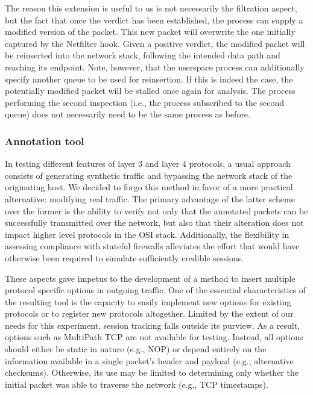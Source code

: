 The reason this extension is useful to us is not necessarily the filtration aspect, but the fact that once the verdict has been established, the process can supply a modified version of the packet. This new packet will overwrite the one initially captured by the Netfilter hook. Given a positive verdict, the modified packet will be reinserted into the network stack, following the intended data path and reaching its endpoint. Note, however, that the userspace process can additionally specify another queue to be used for reinsertion. If this is indeed the case, the potentially modified packet will be stalled once again for analysis. The process performing the second inspection (i.e., the process subscribed to the second queue) does not necessarily need to be the same process as before.

\subsubsection{Annotation tool}
\label{extend:ops:architecture:annotation}

In testing different features of layer 3 and layer 4 protocols, a usual approach consists of generating synthetic traffic and bypassing the network stack of the originating host. We decided to forgo this method in favor of a more practical alternative: modifying real traffic. The primary advantage of the latter scheme over the former is the ability to verify not only that the annotated packets can be successfully transmitted over the network, but also that their alteration does not impact higher level protocols in the OSI stack. Additionally, the flexibility in assessing compliance with stateful firewalls alleviates the effort that would have otherwise been required to simulate sufficiently credible sessions.

These aspects gave impetus to the development of a method to insert multiple protocol specific options in outgoing traffic. One of the essential characteristics of the resulting tool is the capacity to easily implement new options for existing protocols or to register new protocols altogether. Limited by the extent of our needs for this experiment, session tracking falls outside its purview. As a result, options such as MultiPath TCP are not available for testing. Instead, all options should either be static in nature (e.g., NOP) or depend entirely on the information available in a single packet's header and payload (e.g., alternative checksums). Otherwise, its use may be limited to determining only whether the initial packet was able to traverse the network (e.g., TCP timestamps).

